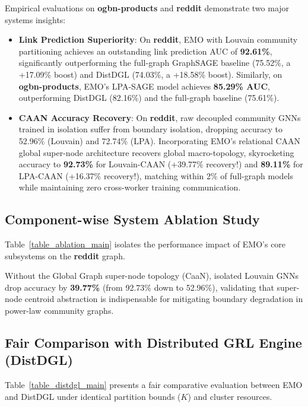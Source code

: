 \documentclass[conference,compsoc]{IEEEtran}
\begin{document}



Empirical evaluations on \textbf{ogbn-products} and \textbf{reddit} demonstrate two major systems insights:
\begin{itemize}
    \item \textbf{Link Prediction Superiority}: On \textbf{reddit}, EMO with Louvain community partitioning achieves an outstanding link prediction AUC of \textbf{92.61\%}, significantly outperforming the full-graph GraphSAGE baseline (75.52\%, a +17.09\% boost) and DistDGL (74.03\%, a +18.58\% boost). Similarly, on \textbf{ogbn-products}, EMO's LPA-SAGE model achieves \textbf{85.29\% AUC}, outperforming DistDGL (82.16\%) and the full-graph baseline (75.61\%).
    \item \textbf{CAAN Accuracy Recovery}: On \textbf{reddit}, raw decoupled community GNNs trained in isolation suffer from boundary isolation, dropping accuracy to 52.96\% (Louvain) and 72.74\% (LPA). Incorporating EMO's relational CAAN global super-node architecture recovers global macro-topology, skyrocketing accuracy to \textbf{92.73\%} for Louvain-CAAN (+39.77\% recovery!) and \textbf{89.11\%} for LPA-CAAN (+16.37\% recovery!), matching within 2\% of full-graph models while maintaining zero cross-worker training communication.
\end{itemize}

\subsection{Component-wise System Ablation Study}
Table~\ref{table_ablation_main} isolates the performance impact of EMO's core subsystems on the \textbf{reddit} graph.



Without the Global Graph super-node topology (CaaN), isolated Louvain GNNs drop accuracy by \textbf{39.77\%} (from 92.73\% down to 52.96\%), validating that super-node centroid abstraction is indispensable for mitigating boundary degradation in power-law community graphs.

\subsection{Fair Comparison with Distributed GRL Engine (DistDGL)}
Table~\ref{table_distdgl_main} presents a fair comparative evaluation between EMO and DistDGL under identical partition bounds ($K$) and cluster resources.
\end{document}
